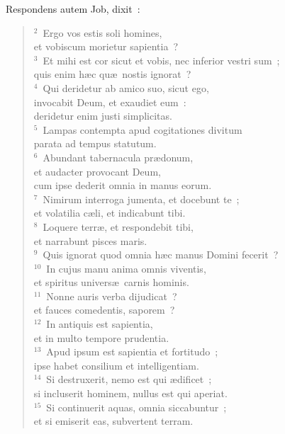 \lettrine[lines=10,image=true,loversize=0.05,lraise=-0.03]{R}{}espondens autem Job, dixit~:
\begin{flushleft}\begin{verse}\vspace{6pt}${}^{2}$~Ergo vos estis soli homines,\\ et vobiscum morietur sapientia~?\\
${}^{3}$~Et mihi est cor sicut et vobis, nec inferior vestri sum~;\\ quis enim h\ae c qu\ae\ nostis ignorat~?\\
${}^{4}$~Qui deridetur ab amico suo, sicut ego,\\ invocabit Deum, et exaudiet eum~:\\ deridetur enim justi simplicitas.\\
${}^{5}$~Lampas contempta apud cogitationes divitum\\ parata ad tempus statutum.\\
${}^{6}$~Abundant tabernacula pr\ae donum,\\ et audacter provocant Deum,\\ cum ipse dederit omnia in manus eorum.\\
${}^{7}$~Nimirum interroga jumenta, et docebunt te~;\\ et volatilia c\ae li, et indicabunt tibi.\\
${}^{8}$~Loquere terr\ae , et respondebit tibi,\\ et narrabunt pisces maris.\\
${}^{9}$~Quis ignorat quod omnia h\ae c manus Domini fecerit~?\\
${}^{10}$~In cujus manu anima omnis viventis,\\ et spiritus univers\ae\ carnis hominis.\\
${}^{11}$~Nonne auris verba dijudicat~?\\ et fauces comedentis, saporem~?\\
${}^{12}$~In antiquis est sapientia,\\ et in multo tempore prudentia.\\
${}^{13}$~Apud ipsum est sapientia et fortitudo~;\\ ipse habet consilium et intelligentiam.\\
${}^{14}$~Si destruxerit, nemo est qui \ae dificet~;\\ si incluserit hominem, nullus est qui aperiat.\\
${}^{15}$~Si continuerit aquas, omnia siccabuntur~;\\ et si emiserit eas, subvertent terram.\\

\end{verse}
\end{flushleft}
